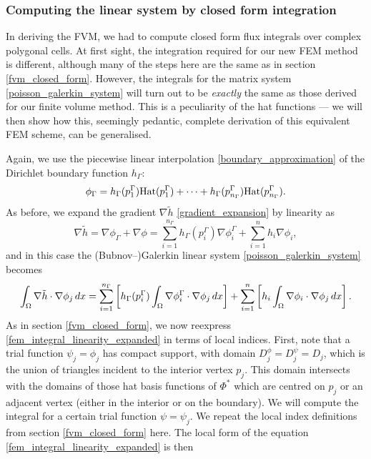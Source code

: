\subsubsection{Computing the linear system by closed form integration}\label{fem_closed_form}
In deriving the FVM, we had to compute closed form flux integrals over complex polygonal cells.
At first sight, the integration required for our new FEM method is different, although many of the steps here are the same as
in section \ref{fvm_closed_form}. However, the integrals for the matrix system \eqref{poisson_galerkin_system} will turn out to be
\textit{exactly} the same as those derived for our finite volume method. This is a peculiarity of the hat functions --- we will then
show how this, seemingly pedantic, complete derivation of this equivalent FEM scheme, can be generalised.

Again, we use the piecewise linear interpolation \eqref{boundary_approximation} of the Dirichlet boundary function $h_\Gamma$:
\begin{equation*}
    \phi_\Gamma = h_\Gamma(p^\Gamma_1)\text{Hat}(p^\Gamma_1)
                + \cdots
                + h_\Gamma(p^\Gamma_{n_\Gamma})\text{Hat}(p^\Gamma_{n_\Gamma}).
\end{equation*}
As before, we expand the gradient $\nabla\tilde{h}$ \eqref{gradient_expansion} by linearity as
\begin{equation*}
    \nabla \tilde{h} = \nabla\phi_\Gamma + \nabla\phi
             = \sum_{i=1}^{n_\Gamma}h_\Gamma(p^\Gamma_i)\nabla\phi^\Gamma_i + \sum_{i=1}^n h_i\nabla\phi_i,
\end{equation*}
and in this case the (Bubnov--)Galerkin linear system \eqref{poisson_galerkin_system} becomes
\begin{equation}\label{fem_integral_linearity_expanded}
    \int_{{\Omega}} \nabla \tilde{h}\cdot \nabla \phi_j\,dx
    =
    \sum_{i=1}^{n_\Gamma}\left[h_\Gamma(p^\Gamma_i)\int_{{\Omega}}\nabla\phi^\Gamma_i\cdot\nabla\phi_j\,dx\right]
    + \sum_{i=1}^n\left[h_i\int_{{\Omega}}\nabla\phi_i\cdot\nabla\phi_j\,dx\right].
\end{equation}
As in section \ref{fvm_closed_form}, we now reexpress \eqref{fem_integral_linearity_expanded} in terms of local indices. First, note that a trial function
$\psi_j = \phi_j$ has compact support, with domain $D^\phi_j = D^\psi_j = D_j$,
which is the union of triangles incident to the interior vertex $p_j$.
This domain intersects with the domains of those hat basis functions of $\Phi^*$ which are centred on $p_j$ or an adjacent vertex
(either in the interior or on the boundary).
We will compute the integral for a certain trial function $\psi = \psi_j$.
We repeat the local index definitions from section \ref{fvm_closed_form} here.
The local form of the equation \eqref{fem_integral_linearity_expanded} is then

